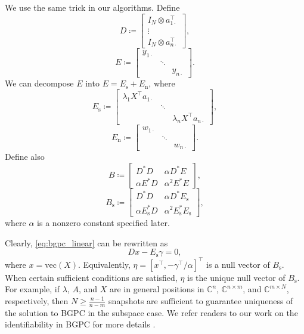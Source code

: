 \documentclass[11pt,journal]{IEEEtran}
\newcommand{\bbC}{\mathbb{C}}
\newcommand{\rms}{\mathrm{s}}
\newcommand{\rmn}{\mathrm{n}}
\newcommand{\T}{\top}
\newcommand{\vect}{\mathrm{vec}}
\begin{document}
We use the same trick in our algorithms. Define
\begin{equation}
\label{eq:D}
D \coloneqq
\begin{bmatrix}
I_N \otimes a_{1\cdot}^\T \\
\vdots \\
I_N \otimes a_{n\cdot}^\T
\end{bmatrix},
\end{equation}
\begin{equation}
\label{eq:E}
E \coloneqq
\begin{bmatrix}
y_{1\cdot} & & \\
& \ddots & \\
& & y_{n\cdot} 
\end{bmatrix}.
\end{equation}
We can decompose $E$ into $E = E_\rms + E_\rmn$, where
\[
E_\rms \coloneqq
\begin{bmatrix}
\lambda_1 X^\T a_{1\cdot} & & \\
& \ddots & \\
& & \lambda_n X^\T a_{n\cdot}
\end{bmatrix},
\]
\[
E_\rmn \coloneqq
\begin{bmatrix}
w_{1\cdot} & & \\
& \ddots & \\
& & w_{n\cdot}
\end{bmatrix}.
\]
Define also
\begin{equation}
\label{eq:B}
B \coloneqq
\begin{bmatrix}
D^*D & \alpha D^*E \\
\alpha E^*D & \alpha^2 E^*E
\end{bmatrix},
\end{equation}
\[
B_\rms \coloneqq
\begin{bmatrix}
D^*D & \alpha D^*E_\rms \\
\alpha E_\rms^*D & \alpha^2 E_\rms^*E_\rms
\end{bmatrix},
\]
where $\alpha$ is a nonzero constant specified later. 

Clearly, \eqref{eq:bgpc_linear} can be rewritten as
\[
D x - E_\rms \gamma = 0,
\]
where $x=\vect(X)$.
Equivalently, $\eta = [x^\T, -\gamma^\T/\alpha]^\T$ is a null vector of $B_\rms$. When certain sufficient conditions are satisfied, $\eta$ is the unique null vector of $B_\rms$. For example, if $\lambda$, $A$, and $X$ are in general positions in $\bbC^n$, $\bbC^{n\times m}$, and $\bbC^{m\times N}$, respectively, then $N \geq \frac{n-1}{n-m}$ snapshots are sufficient to guarantee uniqueness of the solution to BGPC in the subspace case. We refer readers to our work on the identifiability in BGPC for more details \cite{Li2015,Li2015e}. 
\end{document}

